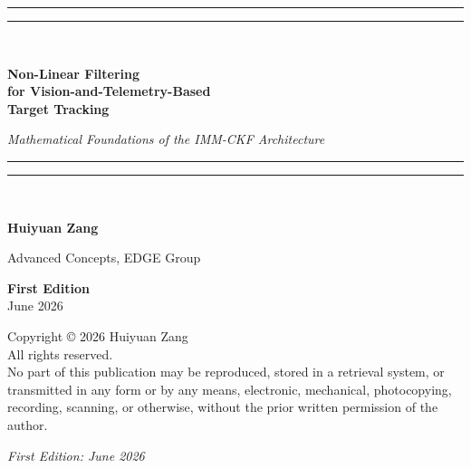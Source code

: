 \frontmatter

\begin{titlepage}
    \centering
    \vspace*{2cm} %
    
    \rule{\textwidth}{1.5pt}\vspace*{-\baselineskip}\vspace*{2pt}
    \rule{\textwidth}{0.5pt}\\[\baselineskip]
    
    {\Huge \bfseries Non-Linear Filtering \\[0.5ex] for Vision-and-Telemetry-Based \\[0.5ex] Target Tracking\par}
    
    \vspace{1cm} 
    
    {\Large \textit{Mathematical Foundations of the IMM-CKF Architecture}\par}
    
    \vspace{0.5cm}
    
    \rule{\textwidth}{0.5pt}\vspace*{-\baselineskip}\vspace*{3.2pt}
    \rule{\textwidth}{1.5pt}\\[\baselineskip]
    
    \vspace{3.5cm} 
    
    {\Large \bfseries Huiyuan Zang\par}
    \vspace{0.5cm}
    {\large Advanced Concepts, EDGE Group\par}
    
    \vfill %
    
    {\large \textbf{First Edition} \\ June 2026\par}
\end{titlepage}

\newpage
\vspace*{\fill}
\noindent Copyright \copyright{} 2026 Huiyuan Zang \\
All rights reserved. \\

\noindent No part of this publication may be reproduced, stored in a retrieval system, or transmitted in any form or by any means, electronic, mechanical, photocopying, recording, scanning, or otherwise, without the prior written permission of the author.

\vspace{1cm}
\noindent \textit{First Edition: June 2026}
\vspace*{\fill}
\clearpage

\setcounter{MaxMatrixCols}{20}